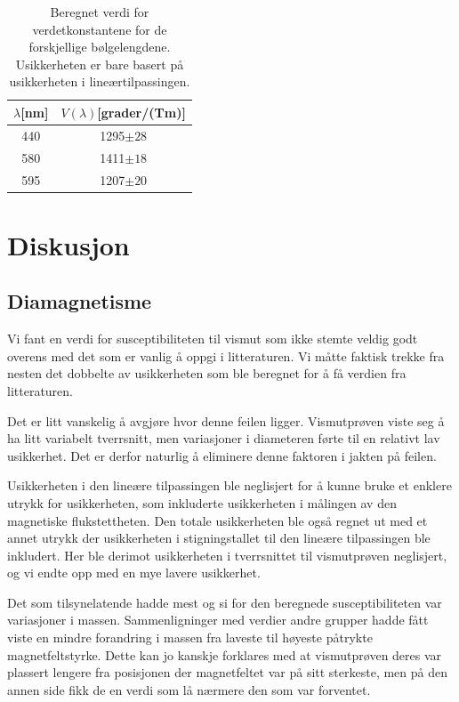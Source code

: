 \documentclass[a4paper,11pt, twocolumn]{article}
\begin{document}
\begin{table}
	\centering
	\caption{Beregnet verdi for verdetkonstantene for de forskjellige bølgelengdene. Usikkerheten er bare basert på usikkerheten i lineærtilpassingen.}
	\begin{tabular}{cc}
		\toprule
		\toprule
		$\lambda$[nm] & $V(\lambda)$[grader/(Tm)]\\
		\toprule
		440 & 1295$\pm 28$\\
		580 & 1411$\pm 18$\\
		595 & 1207$\pm 20$\\
		\toprule
	\end{tabular}
	\label{tab:verdetkonstanten}
\end{table}
\section{Diskusjon}
\subsection{Diamagnetisme}
Vi fant en verdi for susceptibiliteten til vismut som ikke stemte veldig godt overens med det som er vanlig å oppgi i litteraturen. Vi måtte faktisk trekke fra nesten det dobbelte av usikkerheten som ble beregnet for å få verdien fra litteraturen. 

Det er litt vanskelig å avgjøre hvor denne feilen ligger. Vismutprøven viste seg å ha litt variabelt tverrsnitt, men variasjoner i diameteren førte til en relativt lav usikkerhet. Det er derfor naturlig å eliminere denne faktoren i jakten på feilen.

Usikkerheten i den lineære tilpassingen ble neglisjert for å kunne bruke et enklere utrykk for usikkerheten, som inkluderte usikkerheten i målingen av den magnetiske flukstettheten. Den totale usikkerheten ble også regnet ut med et annet utrykk der usikkerheten i stigningstallet til den lineære tilpassingen ble inkludert. Her ble derimot usikkerheten i tverrsnittet til vismutprøven neglisjert, og vi endte opp med en mye lavere usikkerhet.

Det som tilsynelatende hadde mest og si for den beregnede susceptibiliteten var variasjoner i massen. Sammenligninger med verdier andre grupper hadde fått viste en mindre forandring i massen fra laveste til høyeste påtrykte magnetfeltstyrke. Dette kan jo kanskje forklares med at vismutprøven deres var plassert lengere fra posisjonen der magnetfeltet var på sitt sterkeste, men på den annen side fikk de en verdi som lå nærmere den som var forventet.
\end{document}
